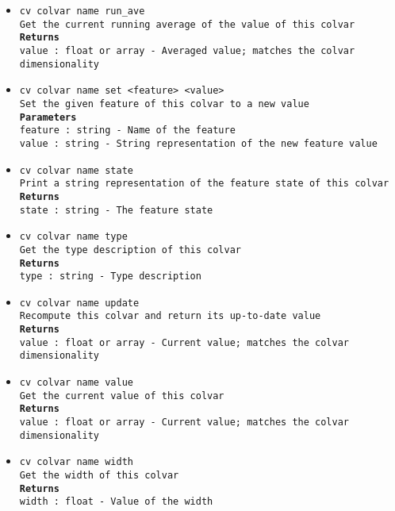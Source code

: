 \begin{itemize}
\item \texttt{cv colvar name run\_ave}
\\
\texttt{Get the current running average of the value of this colvar}
\\
\texttt{\textbf{Returns}}
\\
\texttt{value : float or array - Averaged value; matches the colvar dimensionality}
\item \texttt{cv colvar name set <feature> <value>}
\\
\texttt{Set the given feature of this colvar to a new value}
\\
\texttt{\textbf{Parameters}}
\\
\texttt{feature : string - Name of the feature}
\\
\texttt{value : string - String representation of the new feature value}
\item \texttt{cv colvar name state}
\\
\texttt{Print a string representation of the feature state of this colvar}
\\
\texttt{\textbf{Returns}}
\\
\texttt{state : string - The feature state}
\item \texttt{cv colvar name type}
\\
\texttt{Get the type description of this colvar}
\\
\texttt{\textbf{Returns}}
\\
\texttt{type : string - Type description}
\item \texttt{cv colvar name update}
\\
\texttt{Recompute this colvar and return its up-to-date value}
\\
\texttt{\textbf{Returns}}
\\
\texttt{value : float or array - Current value; matches the colvar dimensionality}
\item \texttt{cv colvar name value}
\\
\texttt{Get the current value of this colvar}
\\
\texttt{\textbf{Returns}}
\\
\texttt{value : float or array - Current value; matches the colvar dimensionality}
\item \texttt{cv colvar name width}
\\
\texttt{Get the width of this colvar}
\\
\texttt{\textbf{Returns}}
\\
\texttt{width : float - Value of the width}
\end{itemize}
